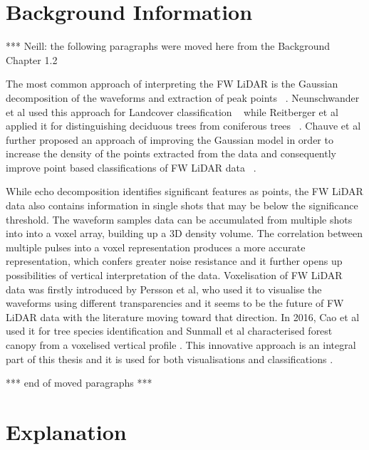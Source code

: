 \documentclass{subfiles}
\begin{document}
\section{Background Information}
		\par {\color{red} *** Neill: the following paragraphs were moved here from the Background Chapter 1.2}
		
		\par The most common approach of interpreting the FW LiDAR is the Gaussian decomposition of the waveforms and extraction of peak points ~\cite{Wanger2006}. Neunschwander et al used this approach for Landcover classification ~\cite{Neuenschwander2009} while Reitberger et al applied it for distinguishing deciduous trees from coniferous trees ~\cite{Reitberger2008}. Chauve et al further proposed an approach of improving the Gaussian model in order to increase the density of the points extracted from the data and consequently improve point based classifications of FW LiDAR data ~\cite{Chauve2007}. 
		
		\par While echo decomposition identifies significant features as points, the FW LiDAR data also contains information in single shots that may be below the significance threshold. The waveform samples data can be accumulated from multiple shots into {\color{blue} into a voxel array, building up a 3D density volume. The correlation between multiple pulses into a voxel representation produces a more accurate representation, which confers greater noise resistance and it further opens up possibilities of vertical interpretation of the data.} Voxelisation {\color{blue} of FW LiDAR data} was firstly introduced by Persson et al, who used it to visualise the waveforms using different transparencies \cite{Persson2005} and it seems to be the future of FW LiDAR data with the literature moving toward that direction. In 2016, Cao et al used it for tree species identification \cite{Cao2016} and Sunmall et al characterised forest canopy from a voxelised vertical profile \cite{Sumnall2016}. This innovative approach is an integral part of this thesis and it is used for both visualisations and classifications \cite{Miltiadou2014}\cite{Miltiadou2015}. 
		\par {\color{red} *** end of moved paragraphs *** }
		
		

	
\section{Explanation}
\end{document}
